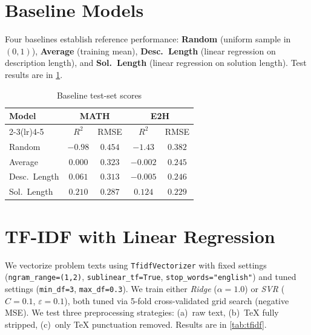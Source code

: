 \documentclass[twocolumn, 10pt]{article}
\begin{document}
\section{Baseline Models}

Four baselines establish reference performance: \textbf{Random} (uniform sample in $(0,1)$), \textbf{Average} (training mean), \textbf{Desc.\ Length} (linear regression on description length), and \textbf{Sol.\ Length} (linear regression on solution length). Test results are in \cref{tab:baselines}.

\begin{table}[ht]
\centering
\caption{Baseline test-set scores}
\label{tab:baselines}
\small
\begin{tabular}{lcccc}
\toprule
\multirow{2}{*}{\textbf{Model}} & \multicolumn{2}{c}{\textbf{MATH}} & \multicolumn{2}{c}{\textbf{E2H}} \\
\cmidrule(lr){2-3}\cmidrule(lr){4-5}
& $R^2$ & RMSE & $R^2$ & RMSE \\
\midrule
Random       & $-0.98$ & $0.454$ & $-1.43$ & $0.382$ \\
Average      & $0.000$ & $0.323$ & $-0.002$ & $0.245$ \\
Desc.\ Length & $0.061$ & $0.313$ & $-0.005$ & $0.246$ \\
Sol.\ Length  & $0.210$ & $0.287$ & $0.124$  & $0.229$ \\
\bottomrule
\end{tabular}
\end{table}

\section{TF-IDF with Linear Regression}
\label{sec:tfidf}

We vectorize problem texts using \texttt{TfidfVectorizer} with fixed settings (\texttt{ngram\_range=(1,2)}, \texttt{sublinear\_tf=True}, \texttt{stop\_words="english"}) and tuned settings (\texttt{min\_df=3}, \texttt{max\_df=0.3}). We train either \textit{Ridge} ($\alpha=1.0$) or \textit{SVR} ($C=0.1$, $\varepsilon=0.1$), both tuned via 5-fold cross-validated grid search (negative MSE). We test three preprocessing strategies: (a)~raw text, (b)~\TeX{} fully stripped, (c)~only \TeX{} punctuation removed. Results are in \cref{tab:tfidf}.
\end{document}
